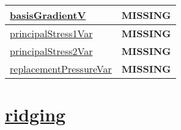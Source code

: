 {\begin{center}
\begin{longtable}{| p{2.0in} | p{4.0in} |}
    \hline
    \hyperref[subsec:var_sec_velocity_variational_basisGradientV]{basisGradientV} & {\bf \color{red} MISSING} \\
    \hline
    \hyperref[subsec:var_sec_velocity_variational_principalStress1Var]{principalStress1Var} & {\bf \color{red} MISSING} \\
    \hline
    \hyperref[subsec:var_sec_velocity_variational_principalStress2Var]{principalStress2Var} & {\bf \color{red} MISSING} \\
    \hline
    \hyperref[subsec:var_sec_velocity_variational_replacementPressureVar]{replacementPressureVar} & {\bf \color{red} MISSING} \\
    \hline
\end{longtable}
\end{center}
}
\section[ridging]{\hyperref[sec:var_sec_ridging]{ridging}}
\label{sec:var_tab_ridging}
\vspace{0.5in}

